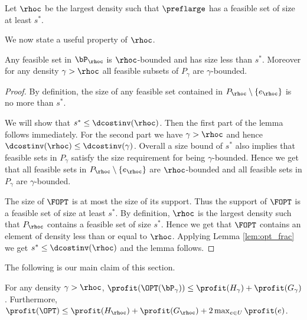 \begin{definition}
Let $\rhoc$ be the largest density such that $\preflarge$ has a feasible set of size at least $s^*$.
\end{definition}

\noindent
We now state a useful property of $\rhoc$. 
\begin{lemma}
  \label{lem:rhoc-indep}
Any feasible set in $\bP_\rhoc$ is $\rhoc$-bounded and has size less than $s^*$. Moreover for any density $\gamma > \rhoc$ all feasible subsets of $P_\gamma$ are $\gamma$-bounded. 
\end{lemma}

\begin{proof}
By definition, the size of any feasible set contained in $P_\rhoc
\setminus \{ e_\rhoc \}$ is no more than $s^*$.

We will show that $s^* \leq \dcostinv( \rhoc)$. Then the first part of the lemma
follows immediately. For the second part we have $\gamma > \rhoc$ and hence 
$\dcostinv(\rhoc) \leq \dcostinv(\gamma) $. Overall a size bound of $s^*$ also implies that 
feasible sets in $P_\gamma$ satisfy the size requirement for being
$\gamma$-bounded. Hence we get that all feasible sets in $P_\rhoc
\setminus \{ e_\rhoc \}$ are $\rhoc$-bounded and all feasible sets
in $P_\gamma$ are $\gamma$-bounded.

The size of $\FOPT$ is at most the size of its support. Thus the
support of $\FOPT$ is a feasible set of size at least $s^*$. By
definition, $\rhoc$ is the largest density such that $P_\rhoc$
contains a feasible set of size $s^*$. Hence we get that $\FOPT$
contains an element of density less than or equal to $\rhoc$. Applying
Lemma \ref{lem:opt_frac} we get $s^* \leq \dcostinv(\rhoc)$ and the
lemma follows.
\end{proof}

\noindent
The following is our main claim of this section. 
\begin{lemma}
  \label{lem:goodprefix} 
For any density $\gamma>\rhoc$,
$\profit(\OPT(\bP_\gamma )) \le \profit(H_\gamma)+\profit(G_\gamma)$. Furthermore, $\profit(\OPT) \leq \profit(H_\rhoc) + \profit(G_\rhoc) + 2\max_{e\in U} \profit(e)$.
\end{lemma}

